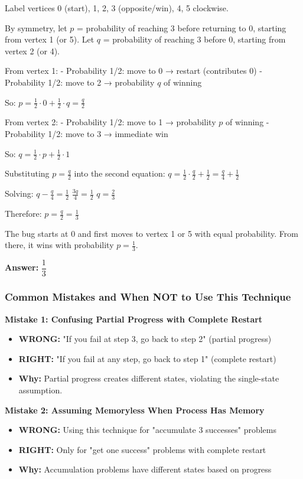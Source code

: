 \documentclass[12pt]{article}
\newenvironment{solution}
{\begin{tcolorbox}[colback=green!5!white,colframe=green!75!black,title={Solution}]}{\end{tcolorbox}}
\begin{document}
\begin{solution}
Label vertices 0 (start), 1, 2, 3 (opposite/win), 4, 5 clockwise.

By symmetry, let $p$ = probability of reaching 3 before returning to 0, starting from vertex 1 (or 5).
Let $q$ = probability of reaching 3 before 0, starting from vertex 2 (or 4).

From vertex 1:
- Probability 1/2: move to 0 → restart (contributes 0)
- Probability 1/2: move to 2 → probability $q$ of winning

So: $p = \frac{1}{2} \cdot 0 + \frac{1}{2} \cdot q = \frac{q}{2}$

From vertex 2:
- Probability 1/2: move to 1 → probability $p$ of winning
- Probability 1/2: move to 3 → immediate win

So: $q = \frac{1}{2} \cdot p + \frac{1}{2} \cdot 1$

Substituting $p = \frac{q}{2}$ into the second equation:
$q = \frac{1}{2} \cdot \frac{q}{2} + \frac{1}{2} = \frac{q}{4} + \frac{1}{2}$

Solving: $q - \frac{q}{4} = \frac{1}{2}$
$\frac{3q}{4} = \frac{1}{2}$
$q = \frac{2}{3}$

Therefore: $p = \frac{q}{2} = \frac{1}{3}$

The bug starts at 0 and first moves to vertex 1 or 5 with equal probability.
From there, it wins with probability $p = \frac{1}{3}$.

\textbf{Answer:} $\dfrac{1}{3}$
\end{solution}

\subsubsection{Common Mistakes and When NOT to Use This Technique}

\textbf{Mistake 1: Confusing Partial Progress with Complete Restart}
\begin{itemize}
    \item \textbf{WRONG:} "If you fail at step 3, go back to step 2" (partial progress)
    \item \textbf{RIGHT:} "If you fail at any step, go back to step 1" (complete restart)
    \item \textbf{Why:} Partial progress creates different states, violating the single-state assumption.
\end{itemize}

\textbf{Mistake 2: Assuming Memoryless When Process Has Memory}
\begin{itemize}
    \item \textbf{WRONG:} Using this technique for "accumulate 3 successes" problems
    \item \textbf{RIGHT:} Only for "get one success" problems with complete restart
    \item \textbf{Why:} Accumulation problems have different states based on progress
\end{itemize}
\end{document}
